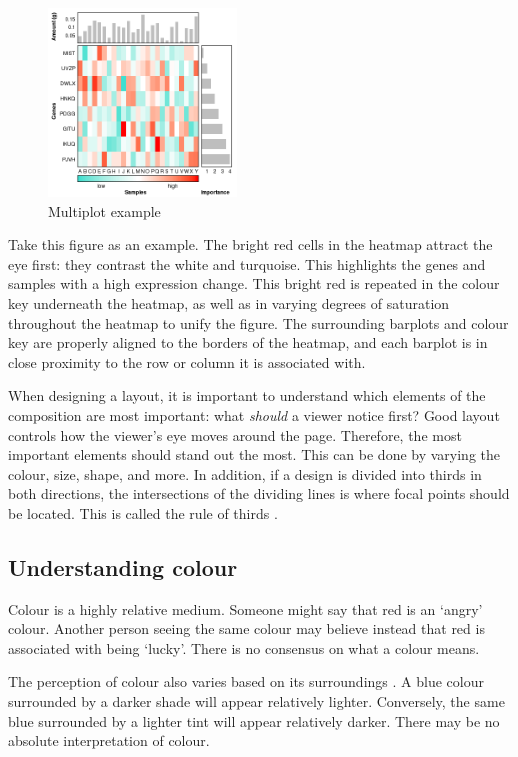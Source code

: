 \documentclass[letterpaper]{article}
\begin{document}
\begin{figure}[!ht]
  \begin{center}
     \includegraphics[width=50mm]{Figures/Multiplot_Ex2.png}
     \caption{Multiplot example}
  \end{center}
\end{figure}

Take this figure as an example. The bright red cells in the heatmap attract the eye first: they contrast the white and turquoise. This highlights the genes and samples with a high expression change. This bright red is repeated in the colour key underneath the heatmap, as well as in varying degrees of saturation throughout the heatmap to unify the figure. The surrounding barplots and colour key are properly aligned to the borders of the heatmap, and each barplot is in close proximity to the row or column it is associated with. 

When designing a layout, it is important to understand which elements of the composition are most important: what \textit{should} a viewer notice first? Good layout controls how the viewer's eye moves around the page. Therefore, the most important elements should stand out the most. This can be done by varying the colour, size, shape, and more. In addition, if a design is divided into thirds in both directions, the intersections of the dividing lines is where focal points should be located. This is called the rule of thirds \cite{wong3}.

\subsection{Understanding colour}
Colour is a highly relative medium. Someone might say that red is an `angry' colour. Another person seeing the same colour may believe instead that red is associated with being `lucky'. There is no consensus on what a colour means. 

The perception of colour also varies based on its surroundings \cite{albers}. A blue colour surrounded by a darker shade will appear relatively lighter. Conversely, the same blue surrounded by a lighter tint will appear relatively darker. There may be no absolute interpretation of colour.
\end{document}

